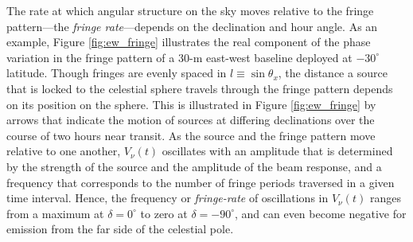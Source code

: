 \documentclass[twocolumn,apj,numberedappendix]{emulateapj}
\begin{document}
The rate at which angular structure on the sky moves relative to the fringe pattern---the \emph{fringe rate}---depends on the declination and hour angle. 
%
%
As an example, Figure \ref{fig:ew_fringe} illustrates the real component of the phase
variation in the fringe pattern of a 30-m east-west baseline deployed at $-30^\circ$ latitude.
Though fringes are evenly spaced in $l\equiv\sin\theta_x$, the distance a source that is locked to the celestial
sphere travels through the fringe pattern depends on its position on the sphere. This is illustrated in Figure
\ref{fig:ew_fringe} by arrows that indicate the motion of sources at differing declinations over the course
of two hours near transit.  As the source and the fringe pattern move relative to one another,  $V_\nu(t)$ oscillates
with an amplitude that is determined by the strength of the source and the amplitude of the beam response,
and a frequency that corresponds to the number of fringe periods traversed in a given time interval.  Hence, the frequency or {\it fringe-rate} of oscillations in $V_\nu(t)$
ranges from a maximum at $\delta=0^\circ$ to zero at $\delta=-90^\circ$, and can even become negative
for emission from the far side of the celestial pole.
\end{document}
